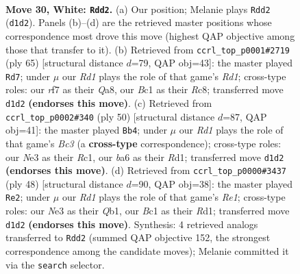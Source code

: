 \documentclass[11pt]{article}
\begin{document}
\clearpage

\begin{figure}[p]\centering
\begin{subfigure}{0.46\textwidth}\centering
\resizebox{\linewidth}{!}{%
\newchessgame
\chessboard[
  setfen={1r1q2k1/p1n1brn1/b6p/P1p2pp1/3p1P2/1P2N1P1/QR2P1BP/2BRN1K1 w - - 0 30},
  showmover=false,
  pgfstyle=straightmove, color=movearrow, markmove={d1-d2}
]}
\caption{}
\end{subfigure}\hfill
\begin{subfigure}{0.46\textwidth}\centering
\resizebox{\linewidth}{!}{%
\newchessgame
\chessboard[
  setfen={q1rr1bk1/5pp1/1pb1pn1p/p7/P2PP3/3BRN1P/R2B1PP1/1Q4K1 b - - 4 33},
  showmover=false,
  pgfstyle=straightmove, color=movearrow, markmove={d8-d7}
]}
\caption{}
\end{subfigure}
\\[4pt]
\begin{subfigure}{0.46\textwidth}\centering
\resizebox{\linewidth}{!}{%
\newchessgame
\chessboard[
  setfen={2r3k1/p2rqpb1/1p1p1n2/1P2pbpp/2P5/Q1B1P2P/P2N1PP1/2RR1BK1 w - - 0 26},
  showmover=false,
  pgfstyle=straightmove, color=movearrow, markmove={c3-b4}
]}
\caption{}
\end{subfigure}\hfill
\begin{subfigure}{0.46\textwidth}\centering
\resizebox{\linewidth}{!}{%
\newchessgame
\chessboard[
  setfen={r2qr1k1/1p4pp/2pbb3/p2n4/5p2/PP1P1NP1/1B3PBP/1Q1RR1K1 w - - 1 25},
  showmover=false,
  pgfstyle=straightmove, color=movearrow, markmove={e1-e2}
]}
\caption{}
\end{subfigure}
\caption{\textbf{Move 30, White: \texttt{Rdd2}.} (a) Our position; Melanie plays \texttt{Rdd2} (\texttt{d1d2}). Panels (b)--(d) are the retrieved master positions whose correspondence most drove this move (highest QAP objective among those that transfer to it). (b) Retrieved from \texttt{ccrl\_top\_p0001\#2719} (ply 65) [structural distance $d$=79, QAP obj=43]: the master played \texttt{Rd7}; under $\mu$ our \emph{Rd1} plays the role of that game's \emph{Rd1}; cross-type roles: our \emph{r}f7 as their \emph{Q}a8, our \emph{B}c1 as their \emph{R}c8; transferred move \texttt{d1d2} \textbf{(endorses this move)}. (c) Retrieved from \texttt{ccrl\_top\_p0002\#340} (ply 50) [structural distance $d$=87, QAP obj=41]: the master played \texttt{Bb4}; under $\mu$ our \emph{Rd1} plays the role of that game's \emph{Bc3} (a \textbf{cross-type} correspondence); cross-type roles: our \emph{N}e3 as their \emph{R}c1, our \emph{b}a6 as their \emph{R}d1; transferred move \texttt{d1d2} \textbf{(endorses this move)}. (d) Retrieved from \texttt{ccrl\_top\_p0000\#3437} (ply 48) [structural distance $d$=90, QAP obj=38]: the master played \texttt{Re2}; under $\mu$ our \emph{Rd1} plays the role of that game's \emph{Re1}; cross-type roles: our \emph{N}e3 as their \emph{Q}b1, our \emph{B}c1 as their \emph{R}d1; transferred move \texttt{d1d2} \textbf{(endorses this move)}. Synthesis: 4 retrieved analogs transferred to \texttt{Rdd2} (summed QAP objective 152, the strongest correspondence among the candidate moves); Melanie committed it via the \texttt{search} selector.}
\label{fig:thought-m58}
\end{figure}
\end{document}
